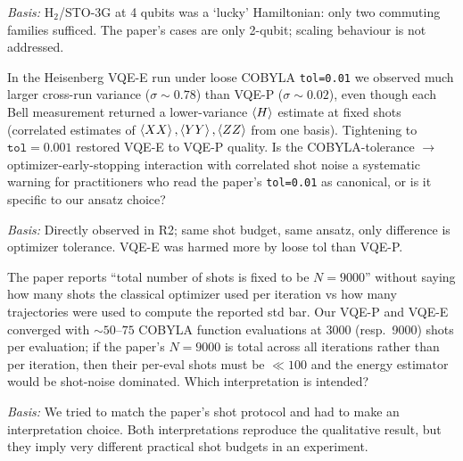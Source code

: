 \begin{description}
\emph{Basis:} H$_2$/STO-3G at 4 qubits was a `lucky' Hamiltonian: only two
commuting families sufficed. The paper's cases are only 2-qubit; scaling
behaviour is not addressed.

\item[Q4 --- COBYLA-tolerance sensitivity of Bell VQE.]
In the Heisenberg VQE-E run under loose COBYLA \texttt{tol=0.01} we
observed much larger cross-run variance ($\sigma\!\sim\!0.78$) than VQE-P
($\sigma\!\sim\!0.02$), even though each Bell measurement returned a
lower-variance $\braket{H}$ estimate at fixed shots (correlated estimates
of $\braket{XX},\braket{YY},\braket{ZZ}$ from one basis). Tightening to
$\texttt{tol}=0.001$ restored VQE-E to VQE-P quality. Is the
COBYLA-tolerance $\to$ optimizer-early-stopping interaction with
correlated shot noise a systematic warning for practitioners who read the
paper's \texttt{tol=0.01} as canonical, or is it specific to our ansatz
choice?

\emph{Basis:} Directly observed in R2; same shot budget, same ansatz, only
difference is optimizer tolerance. VQE-E was harmed more by loose tol
than VQE-P.

\item[Q5 --- Per-iteration vs total-shot budget in the paper.]
The paper reports ``total number of shots is fixed to be $N=9000$'' without
saying how many shots the classical optimizer used per iteration vs how
many trajectories were used to compute the reported std bar. Our VQE-P and
VQE-E converged with $\sim50$--$75$ COBYLA function evaluations at 3000
(resp.\ 9000) shots per evaluation; if the paper's $N=9000$ is total
across all iterations rather than per iteration, then their per-eval
shots must be $\ll 100$ and the energy estimator would be shot-noise
dominated. Which interpretation is intended?

\emph{Basis:} We tried to match the paper's shot protocol and had to make
an interpretation choice. Both interpretations reproduce the qualitative
result, but they imply very different practical shot budgets in an
experiment.
\end{description}
